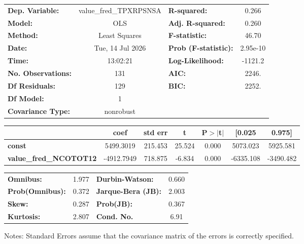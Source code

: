 \begin{center}
\begin{tabular}{lclc}
\toprule
\textbf{Dep. Variable:}        & value\_fred\_TPXRPSNSA & \textbf{  R-squared:         } &     0.266   \\
\textbf{Model:}                &          OLS           & \textbf{  Adj. R-squared:    } &     0.260   \\
\textbf{Method:}               &     Least Squares      & \textbf{  F-statistic:       } &     46.70   \\
\textbf{Date:}                 &    Tue, 14 Jul 2026    & \textbf{  Prob (F-statistic):} &  2.95e-10   \\
\textbf{Time:}                 &        13:02:21        & \textbf{  Log-Likelihood:    } &   -1121.2   \\
\textbf{No. Observations:}     &            131         & \textbf{  AIC:               } &     2246.   \\
\textbf{Df Residuals:}         &            129         & \textbf{  BIC:               } &     2252.   \\
\textbf{Df Model:}             &              1         & \textbf{                     } &             \\
\textbf{Covariance Type:}      &       nonrobust        & \textbf{                     } &             \\
\bottomrule
\end{tabular}
\begin{tabular}{lcccccc}
                               & \textbf{coef} & \textbf{std err} & \textbf{t} & \textbf{P$> |$t$|$} & \textbf{[0.025} & \textbf{0.975]}  \\
\midrule
\textbf{const}                 &    5499.3019  &      215.453     &    25.524  &         0.000        &     5073.023    &     5925.581     \\
\textbf{value\_fred\_NCOTOT12} &   -4912.7949  &      718.875     &    -6.834  &         0.000        &    -6335.108    &    -3490.482     \\
\bottomrule
\end{tabular}
\begin{tabular}{lclc}
\textbf{Omnibus:}       &  1.977 & \textbf{  Durbin-Watson:     } &    0.660  \\
\textbf{Prob(Omnibus):} &  0.372 & \textbf{  Jarque-Bera (JB):  } &    2.003  \\
\textbf{Skew:}          &  0.287 & \textbf{  Prob(JB):          } &    0.367  \\
\textbf{Kurtosis:}      &  2.807 & \textbf{  Cond. No.          } &     6.91  \\
\bottomrule
\end{tabular}
\end{center}

Notes: \newline
 [1] Standard Errors assume that the covariance matrix of the errors is correctly specified.